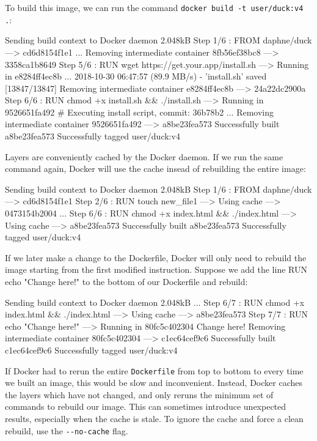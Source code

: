 \documentclass[12pt,initial,twoside,maitrise]{dms}
\def\inline{\lstinline[basicstyle=\ttfamily]}
\numberwithin{equation}{section}
\numberwithin{table}{chapter}
\numberwithin{figure}{chapter}
\begin{document}
To build this image, we can run the command \inline{docker build -t user/duck:v4 .}:

\begin{pclisting}
Sending build context to Docker daemon  2.048kB
Step 1/6 : FROM daphne/duck
---> cd6d8154f1e1
...
Removing intermediate container 8fb56ef38bc8
---> 3358ca1b8649
Step 5/6 : RUN wget https://get.your.app/install.sh
---> Running in e8284ff4ec8b
...
2018-10-30 06:47:57 (89.9 MB/s) - 'install.sh' saved [13847/13847]
Removing intermediate container e8284ff4ec8b
---> 24a22dc2900a
Step 6/6 : RUN chmod +x install.sh && ./install.sh
---> Running in 9526651fa492
# Executing install script, commit: 36b78b2
...
Removing intermediate container 9526651fa492
---> a8be23fea573
Successfully built a8be23fea573
Successfully tagged user/duck:v4
\end{pclisting}

Layers are conveniently cached by the Docker daemon. If we run the same command again, Docker will use the cache insead of rebuilding the entire image:

\begin{pclisting}
Sending build context to Docker daemon  2.048kB
Step 1/6 : FROM daphne/duck
---> cd6d8154f1e1
Step 2/6 : RUN touch new_file1
---> Using cache
---> 0473154b2004
...
Step 6/6 : RUN chmod +x index.html && ./index.html
---> Using cache
---> a8be23fea573
Successfully built a8be23fea573
Successfully tagged user/duck:v4
\end{pclisting}

If we later make a change to the Dockerfile, Docker will only need to rebuild the image starting from the first modified instruction. Suppose we add the line RUN echo "Change here!" to the bottom of our Dockerfile and rebuild:

\begin{pclisting}
Sending build context to Docker daemon  2.048kB
...
Step 6/7 : RUN chmod +x index.html && ./index.html
---> Using cache
---> a8be23fea573
Step 7/7 : RUN echo "Change here!"
---> Running in 80fc5c402304
Change here!
Removing intermediate container 80fc5c402304
---> c1ec64cef9c6
Successfully built c1ec64cef9c6
Successfully tagged user/duck:v4
\end{pclisting}

If Docker had to rerun the entire \inline{Dockerfile} from top to bottom to every time we built an image, this would be slow and inconvenient. Instead, Docker caches the layers which have not changed, and only reruns the minimum set of commands to rebuild our image. This can sometimes introduce unexpected results, especially when the cache is stale. To ignore the cache and force a clean rebuild, use the \inline{--no-cache} flag.
\end{document}
